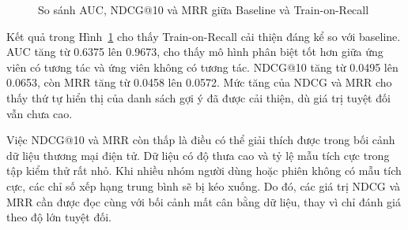 \begin{figure}[H]
\centering
{}
\caption{So sánh AUC, NDCG@10 và MRR giữa Baseline và Train-on-Recall}
\label{fig:ranking_metrics_comparison}
\end{figure}

Kết quả trong Hình~\ref{fig:ranking_metrics_comparison} cho thấy Train-on-Recall cải thiện đáng kể so với baseline. AUC tăng từ 0.6375 lên 0.9673, cho thấy mô hình phân biệt tốt hơn giữa ứng viên có tương tác và ứng viên không có tương tác. NDCG@10 tăng từ 0.0495 lên 0.0653, còn MRR tăng từ 0.0458 lên 0.0572. Mức tăng của NDCG và MRR cho thấy thứ tự hiển thị của danh sách gợi ý đã được cải thiện, dù giá trị tuyệt đối vẫn chưa cao.
\medskip

Việc NDCG@10 và MRR còn thấp là điều có thể giải thích được trong bối cảnh dữ liệu thương mại điện tử. Dữ liệu có độ thưa cao và tỷ lệ mẫu tích cực trong tập kiểm thử rất nhỏ. Khi nhiều nhóm người dùng hoặc phiên không có mẫu tích cực, các chỉ số xếp hạng trung bình sẽ bị kéo xuống. Do đó, các giá trị NDCG và MRR cần được đọc cùng với bối cảnh mất cân bằng dữ liệu, thay vì chỉ đánh giá theo độ lớn tuyệt đối.

